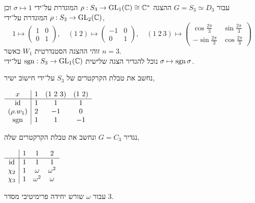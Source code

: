 \begin{example}
	עבור $G = S_3 \simeq D_3$ ההצגה $\rho : S_3 \to \operatorname{GL}_1(\mathbb{C}) \cong \mathbb{C}^*$ המוגדרת על־ידי $\sigma \mapsto 1$ וכן $\rho : S_3 \to \operatorname{GL}_2(\mathbb{C})$ המוגדרת על־ידי,
	\[
		1 \mapsto \begin{pmatrix} 1 & 0 \\ 0 & 1 \end{pmatrix},
		\quad
		(1\ 2) \mapsto \begin{pmatrix} -1 & 0 \\ 0 & 1 \end{pmatrix},
		\quad
		(1\ 2\ 3) \mapsto \begin{pmatrix} \cos \frac{2 \pi}{3} & \sin \frac{2 \pi}{3} \\ -\sin \frac{2 \pi}{3} & \cos \frac{2 \pi}{3} \end{pmatrix}
	\]
	זוהי ההצגה הסטנדרטית $W_1$ כאשר $n = 3$. \\
	נוכל להגדיר הצגה שלישית $\operatorname{sgn} : S_3 \to \operatorname{GL}_1(\mathbb{C})$ על־ידי $\sigma \mapsto \operatorname{sgn} \sigma$.
\end{example}
נחשב את טבלת הקרקטרים של $S_3$ על־ידי חישוב ישיר,
\begin{otherlanguage}{english}
	\begin{center}
		$\begin{array}{c| c c c} %
			x & 1 & (1\ 2\ 3) & (1\ 2) \\
			\hline %
			\id & 1 & 1 & 1 \\
			(\rho . w_1) & 2 & -1 & 0 \\
			\sgn & 1 & 1 & -1
		\end{array}$
	\end{center}
\end{otherlanguage}
\begin{example}
	נגדיר $G = C_3$ ונחשב את טבלת הקרקטרים שלה,
	\begin{otherlanguage}{english}
		\begin{center}
			$\begin{array}{c| c c c} %
				& 1 & 1 & 2 \\
				\hline %
				\id & 1 & 1 & 1 \\
				\chi_2 & 1 & \omega & \omega^2 \\
				\chi_3 & 1 & \omega^2 & \omega
			\end{array}$
		\end{center}
	\end{otherlanguage}
	עבור $\omega$ שורש יחידה פרימיטיבי מסדר $3$.
\end{example}


